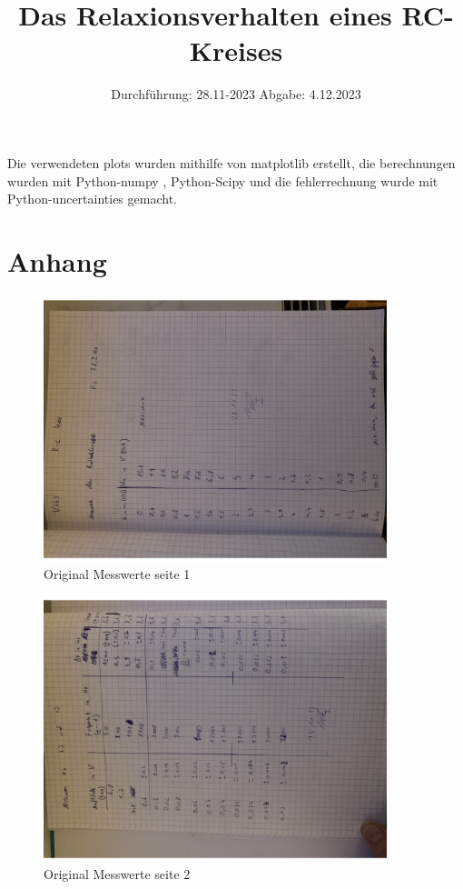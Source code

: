 

\subject{V353}
\title{Das Relaxionsverhalten eines RC-Kreises}
\date{%
  Durchführung: 28.11-2023
  \hspace{3em}
  Abgabe: 4.12.2023
}



\maketitle
\thispagestyle{empty}
\tableofcontents
\newpage






\printbibliography{}

Die verwendeten plots wurden mithilfe von matplotlib \cite{matplotlib} erstellt, die berechnungen wurden mit Python-numpy \cite{numpy}, Python-Scipy \cite{scipy} und die fehlerrechnung wurde mit Python-uncertainties \cite{uncertainties} gemacht.

\section{Anhang}
\begin{figure}
\centering
\includegraphics[width = 10cm]{V353ori1.pdf}
\caption{Original Messwerte seite 1}
\end{figure}
\begin{figure}
  \centering
  \includegraphics[width = 10cm]{V353ori2.pdf}
  \caption{Original Messwerte seite 2}
  \end{figure}

